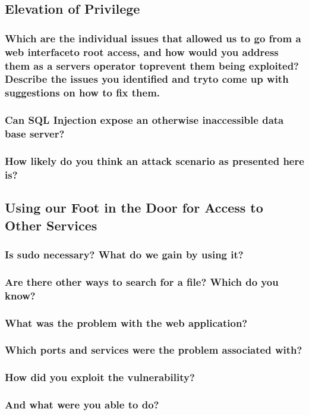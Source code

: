 \subsection{Elevation of Privilege}
\subsubsection{Which are the individual issues that allowed us to go from a web interfaceto root access, and how would you address them as a servers operator toprevent them being exploited? Describe the issues you identified and tryto come up with suggestions on how to fix them.}
\subsubsection{Can SQL Injection expose an otherwise inaccessible data base server?}
\subsubsection{How likely do you think an attack scenario as presented here is?}

\subsection{Using our Foot in the Door for Access to Other Services}
\subsubsection{Is sudo necessary? What do we gain by using it?}
\subsubsection{Are there other ways to search for a file? Which do you know?}
\subsubsection{What was the problem with the web application?}
\subsubsection{Which ports and services were the problem associated with?}
\subsubsection{How did you exploit the vulnerability?}
\subsubsection{And what were you able to do?}
